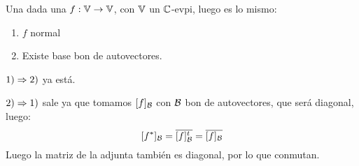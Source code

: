 \documentclass{article}
\begin{document}
\begin{teo}
    Una dada una $f : \mathbb{V} \to \mathbb{V}$, con $\mathbb{V}$ un $\mathbb{C}$-evpi, luego es lo mismo:
    \begin{enumerate}
        \item $f$ normal
        \item Existe base bon de autovectores.
    \end{enumerate}
\end{teo}
\begin{demo}
    $1) \Rightarrow 2)$ ya está.

    $2) \Rightarrow 1)$ sale ya que tomamos $[f]_{\mathcal{B}}$ con $\mathcal{B}$ bon de autovectores, que será diagonal, luego:
    \[[f^*]_{\mathcal{B}} =
        \overline {[f]_{\mathcal{B}}^t} =
        \overline {[f]_{\mathcal{B}}}
    \]
    Luego la matriz de la adjunta también es diagonal, por lo que conmutan.
\end{demo}
\end{document}

